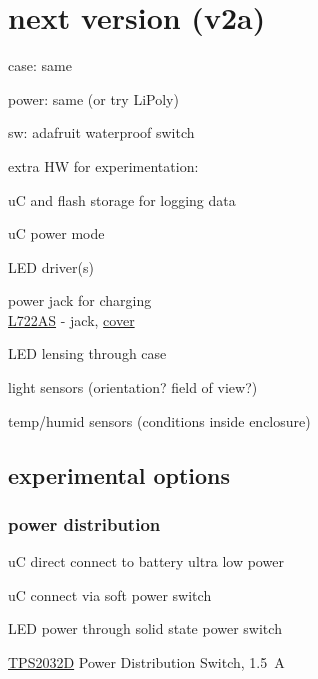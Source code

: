 \documentclass[12pt]{article} %
\begin{document}
\section{next version (v2a)}
\begin{compactitem}
	\item case: same
	\item power: same (or try LiPoly)
	\item sw: adafruit waterproof switch
	\item extra HW for experimentation:
	\begin{compactitem}
		\item uC and flash storage for logging data
		\item uC power mode
		\item LED driver(s)
		\item power jack for charging
			\\ \href{http://www.digikey.com/product-detail/en/L722AS/SC1392-ND/2238435}{L722AS} - jack,
			\href{http://www.digikey.com/product-detail/en/JCAP/SC1396-ND/2251492}{cover}
		\item LED lensing through case
		\item light sensors (orientation? field of view?)
		\item temp/humid sensors (conditions inside enclosure)
	\end{compactitem}
\end{compactitem}

\subsection{experimental options}

\subsubsection{power distribution}
\begin{compactitem}
\item uC direct connect to battery ultra low power
\item uC connect via soft power switch
\item LED power through solid state power switch
\end{compactitem}
\href{http://www.digikey.com/product-detail/en/TPS2032D/296-2567-5-ND/306440}{TPS2032D} Power Distribution Switch, \SI{1.5}{\ampere}
\end{document}
